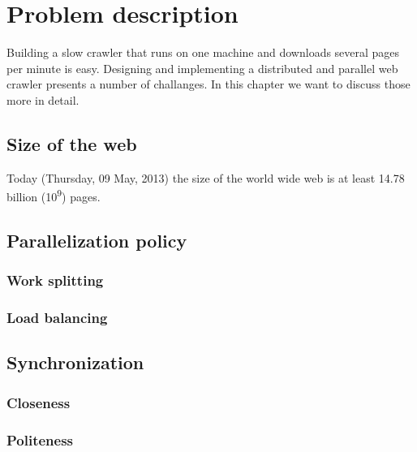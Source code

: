 \chapter{Problem description} %
Building a slow crawler that runs on one machine and downloads several pages per minute is easy. Designing and implementing a distributed and parallel web crawler presents a number of challanges. In this chapter we want to discuss those more in detail.

\label{Chapter3} %


\section{Size of the web}
Today (Thursday, 09 May, 2013) the size of the world wide web is at least 14.78 billion (10\textsuperscript{9}) pages.\cite{wwwsize}

\section{Parallelization policy}

\subsection{Work splitting}
\subsection{Load balancing}

\section{Synchronization}
\subsection{Closeness}
\subsection{Politeness}


